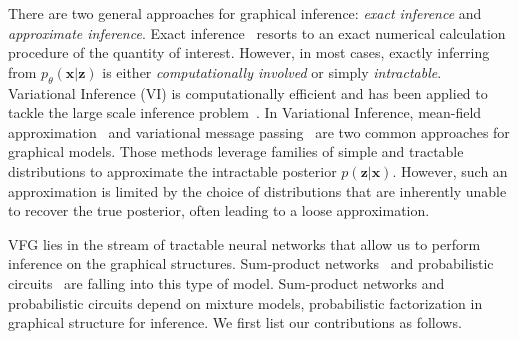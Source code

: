 \documentclass[twoside]{article}
\newcommand{\RN}[1]{%
	\textup{\lowercase\expandafter{\it \romannumeral#1}}%
}
\begin{document}

There are two general approaches for graphical inference: \textit{exact inference} and \textit{approximate inference}. Exact inference~\cite{sanner2012symbolic,kahle2008junction} resorts to an exact numerical calculation procedure of the quantity of interest. 
However, in most cases, exactly inferring from $p_{\theta}(\mathbf{x}|\mathbf{z})$ is either \emph{computationally involved} or simply \emph{intractable}. 
Variational Inference (VI) is computationally efficient and has been applied to tackle the large scale inference problem~\cite{jordan1999introduction,hoffman2013stochastic, kingma2013auto, liu2016stein}.
In Variational Inference, mean-field approximation~\cite{xing2012generalized} and variational message passing~\cite{bishop2003vibes,winn2005variational} are two common approaches for graphical models.
Those methods leverage families of simple and tractable distributions to approximate the intractable posterior $p(\mathbf{z}|\mathbf{x})$.
However, such an approximation is limited by the choice of distributions that are inherently unable to recover the true posterior, often leading to a loose approximation. 


VFG lies in the stream of tractable neural networks that allow us to perform inference on the graphical structures.  Sum-product networks~\cite{sanchez2021sum} and probabilistic circuits~\cite{choi2020probabilistic} are falling into this type of model. Sum-product networks and probabilistic circuits depend on mixture models, probabilistic factorization in graphical structure for inference.  We first list our contributions as follows. 
\end{document}
